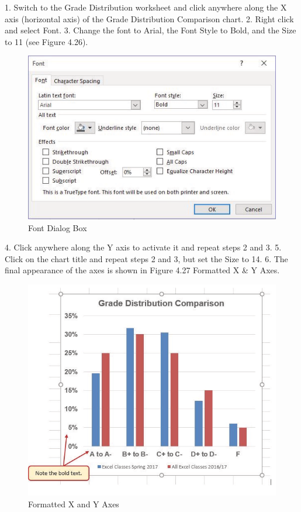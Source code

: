1. Switch to the Grade Distribution worksheet and click anywhere along the X axis (horizontal
axis) of the Grade Distribution Comparison chart.
2. Right click and select Font.
3. Change the font to Arial, the Font Style to Bold, and the Size to 11 (see Figure 4.26).



\begin{figure}[H]
	\centering
	\includegraphics[width=\maxwidth{.95\linewidth}]{gfx/ch04_fig29}
	\caption{Font Dialog Box}
	\label{04:fig29}
\end{figure}





4. Click anywhere along the Y axis to activate it and repeat steps 2 and 3.
5. Click on the chart title and repeat steps 2 and 3, but set the Size to 14.
6. The final appearance of the axes is shown in Figure 4.27 Formatted X \& Y Axes.



\begin{figure}[H]
	\centering
	\includegraphics[width=\maxwidth{.95\linewidth}]{gfx/ch04_fig30}
	\caption{Formatted X and Y Axes}
	\label{04:fig30}
\end{figure}






